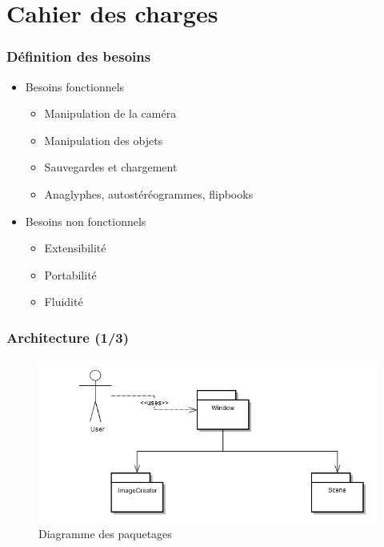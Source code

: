 \documentclass{beamer}
\begin{document}
%
\section{Cahier des charges}


\begin{frame}
\frametitle{Définition des besoins}
\begin{itemize}[label=$\bullet$]
\item Besoins fonctionnels
	\begin{itemize}[label=$\circ$]
	\item Manipulation de la caméra
	\item Manipulation des objets
	\item Sauvegardes et chargement
	\item Anaglyphes, autostéréogrammes, flipbooks
	\end{itemize}
\item Besoins non fonctionnels
	\begin{itemize}[label=$\circ$]
	\item Extensibilité
	\item Portabilité
	\item Fluidité
	\end{itemize}
\end{itemize}
\end{frame}


\begin{frame}
\frametitle{Architecture (1/3)}
\centering
\begin{figure}
  \includegraphics[scale=0.4]{paquetages.jpg}
  \caption{Diagramme des paquetages}
\end{figure}
\end{frame}

\end{document}
